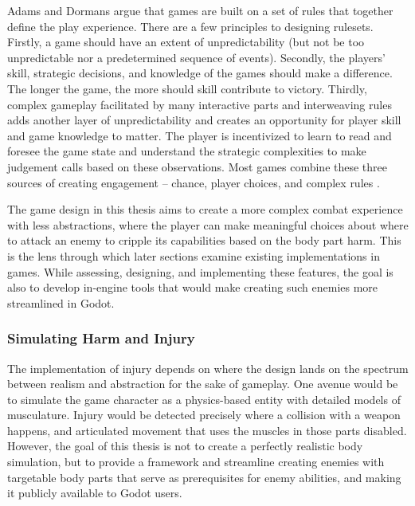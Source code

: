 Adams and Dormans argue that games are built on a set of rules that together define the play experience. There are a few principles to designing rulesets. Firstly, a game should have an extent of unpredictability (but not be too unpredictable nor a predetermined sequence of events). Secondly, the players' skill, strategic decisions, and knowledge of the games should make a difference. The longer the game, the more should skill contribute to victory. Thirdly, complex gameplay facilitated by many interactive parts and interweaving rules adds another layer of unpredictability and creates an opportunity for player skill and game knowledge to matter. The player is incentivized to learn to read and foresee the game state and understand the strategic complexities to make judgement calls based on these observations. Most games combine these three sources of creating engagement -- chance, player choices, and complex rules \cite{adams2012AdvancedGameDesign}.

The game design in this thesis aims to create a more complex combat experience with less abstractions, where the player can make meaningful choices about where to attack an enemy to cripple its capabilities based on the body part harm. This is the lens through which later sections examine existing implementations in games. While assessing, designing, and implementing these features, the goal is also to develop in-engine tools that would make creating such enemies more streamlined in Godot.

\subsubsection{Simulating Harm and Injury}
The implementation of injury depends on where the design lands on the spectrum between realism and abstraction for the sake of gameplay. One avenue would be to simulate the game character as a physics-based entity with detailed models of musculature. Injury would be detected precisely where a collision with a weapon happens, and articulated movement that uses the muscles in those parts disabled. However, the goal of this thesis is not to create a perfectly realistic body simulation, but to provide a framework and streamline creating enemies with targetable body parts that serve as prerequisites for enemy abilities, and making it publicly available to Godot users.



